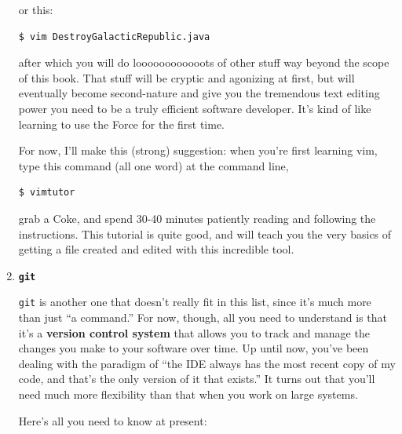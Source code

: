 \begin{enumerate}
or this:

\begin{verbatim}
$ vim DestroyGalacticRepublic.java
\end{verbatim}

after which you will do loooooooooooots of other stuff way beyond the scope of
this book. That stuff will be cryptic and agonizing at first, but will
eventually become second-nature and give you the tremendous text editing power
you need to be a truly efficient software developer. It's kind of like
learning to use the Force for the first time.

For now, I'll make this (strong) suggestion: when you're first learning vim,
type this command (all one word) at the command line,

\begin{verbatim}
$ vimtutor
\end{verbatim}

grab a Coke, and spend 30-40 minutes patiently reading and following the
instructions. This tutorial is quite good, and will teach you the very basics
of getting a file created and edited with this incredible tool.

\bigline

\item \textbf{\texttt{git}}
\label{introduceGit}

\texttt{git} is another one that doesn't really fit in this list, since it's
much more than just ``a command.'' For now, though, all you need to understand
is that it's a \textbf{version control system} that allows you to track and
manage the changes you make to your software over time. Up until now, you've
been dealing with the paradigm of ``the IDE always has the most recent copy of
my code, and that's the only version of it that exists.'' It turns out that
you'll need much more flexibility than that when you work on large systems.

Here's all you need to know at present:


\end{enumerate}
